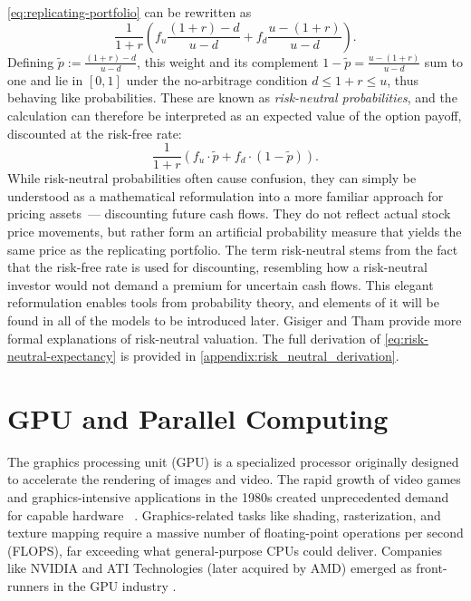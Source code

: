 \documentclass[english,12pt,a4paper,pdftex,sci,utf8]{aaltothesis}
\begin{document}
\cref{eq:replicating-portfolio} can be rewritten as
\begin{equation*}
     \frac{1}{1+r}\left(f_u\frac{(1+r)-d}{u-d}+f_d\frac{u-(1+r)}{u-d}\right).
\end{equation*}
Defining $\tilde{p} := \frac{(1+r)-d}{u-d}$, this weight and its complement $1-\tilde{p} = \frac{u-(1+r)}{u-d}$ sum to one and lie in $[0,1]$ under the no-arbitrage condition $d \leq 1+r \leq u$, thus behaving like probabilities. These are known as \emph{risk-neutral probabilities}, and the calculation can therefore be interpreted as an expected value of the option payoff, discounted at the risk-free rate:
\begin{equation}
     \frac{1}{1+r}(f_u\cdot \tilde p + f_d \cdot (1-\tilde p)).
\label{eq:risk-neutral-expectancy}
\end{equation}
While risk-neutral probabilities often cause confusion, they can simply be understood as a mathematical reformulation into a more familiar approach for pricing assets~--- discounting future cash flows. They do not reflect actual stock price movements, but rather form an artificial probability measure that yields the same price as the replicating portfolio. The term risk-neutral stems from the fact that the risk-free rate is used for discounting, resembling how a risk-neutral investor would not demand a premium for uncertain cash flows. This elegant reformulation enables tools from probability theory, and elements of it will be found in all of the models to be introduced later. Gisiger \cite{gisiger2010risk} and Tham \cite{tham2001risk} provide more formal explanations of risk-neutral valuation. The full derivation of \cref{eq:risk-neutral-expectancy} is provided in \cref{appendix:risk_neutral_derivation}.

\clearpage

\section{GPU and Parallel Computing}\label{sec:gpu}

The graphics processing unit (GPU) is a specialized processor originally designed to accelerate the rendering of images and video. The rapid growth of video games and graphics-intensive applications in the 1980s created unprecedented demand for capable hardware ~\cite{sanders2010cuda, kirk2016programming}. Graphics-related tasks like shading, rasterization, and texture mapping require a massive number of floating-point operations per second (FLOPS), far exceeding what general-purpose CPUs could deliver. Companies like NVIDIA and ATI Technologies (later acquired by AMD) emerged as front-runners in the GPU industry \cite{sanders2010cuda}.
\end{document}
